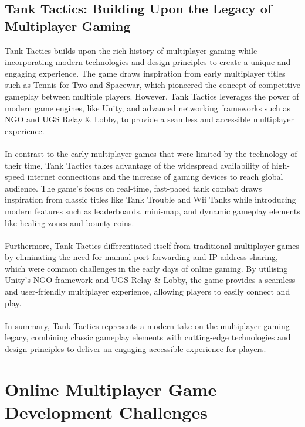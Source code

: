 \subsection{Tank Tactics: Building Upon the Legacy of Multiplayer Gaming}
Tank Tactics builds upon the rich history of multiplayer gaming while incorporating modern technologies and design principles to create a unique and engaging experience. The game draws inspiration from early multiplayer titles such as Tennis for Two and Spacewar, which pioneered the concept of competitive gameplay between multiple players. However, Tank Tactics leverages the power of modern game engines, like Unity, and advanced networking frameworks such as NGO and UGS Relay \& Lobby, to provide a seamless and accessible multiplayer experience.
\\
\noindent
\\
In contrast to the early multiplayer games that were limited by the technology of their time, Tank Tactics takes advantage of the widespread availability of high-speed internet connections and the increase of gaming devices to reach global audience. The game's focus on real-time, fast-paced tank combat draws inspiration from classic titles like Tank Trouble and Wii Tanks while introducing modern features such as leaderboards, mini-map, and dynamic gameplay elements like healing zones and bounty coins.
\\
\noindent
\\
Furthermore, Tank Tactics differentiated itself from traditional multiplayer games by eliminating the need for manual port-forwarding and IP address sharing, which were common challenges in the early days of online gaming. By utilising Unity's NGO framework and UGS Relay \& Lobby, the game provides a seamless and user-friendly multiplayer experience, allowing players to easily connect and play.
\\
\noindent
\\
In summary, Tank Tactics represents a modern take on the multiplayer gaming legacy, combining classic gameplay elements with cutting-edge technologies and design principles to deliver an engaging accessible experience for players.

\section{Online Multiplayer Game Development Challenges} 
  
